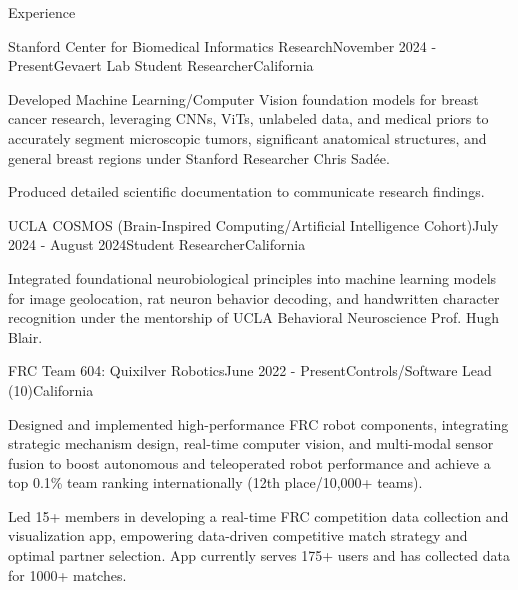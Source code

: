 \documentclass[
  10pt, %
]{resume}
\begin{document}
\sloppy


\begin{rSection}{Experience}


  \begin{rSubsection}{Stanford Center for Biomedical Informatics Research}{November 2024 - Present}{Gevaert Lab Student Researcher}{California}
    
    \item Developed Machine Learning/Computer Vision foundation models for breast cancer research, leveraging CNNs, ViTs, unlabeled data, and medical priors to accurately segment microscopic tumors, significant anatomical structures, and general breast regions under Stanford Researcher Chris Sadée.
    
    \item Produced detailed scientific documentation to communicate research findings.
    
  \end{rSubsection}
        
  \begin{rSubsection}{UCLA COSMOS (Brain-Inspired Computing/Artificial Intelligence Cohort)}{July 2024 - August 2024}{Student Researcher}{California}
    
    \item Integrated foundational neurobiological principles into machine learning models for image geolocation, rat neuron behavior decoding, and handwritten character recognition under the mentorship of UCLA Behavioral Neuroscience Prof. Hugh Blair.
    
  \end{rSubsection}
        
  \begin{rSubsection}{FRC Team 604: Quixilver Robotics}{June 2022 - Present}{Controls/Software Lead (10)}{California}
    
    \item Designed and implemented high-performance FRC robot components, integrating strategic mechanism design, real-time computer vision, and multi-modal sensor fusion to boost autonomous and teleoperated robot performance and achieve a top 0.1\% team ranking internationally (12th place/10,000+ teams).
    
    \item Led 15+ members in developing a real-time FRC competition data collection and visualization app, empowering data-driven competitive match strategy and optimal partner selection. App currently serves 175+ users and has collected data for 1000+ matches.
    

\end{rSubsection}
\end{rSection}
\end{document}
